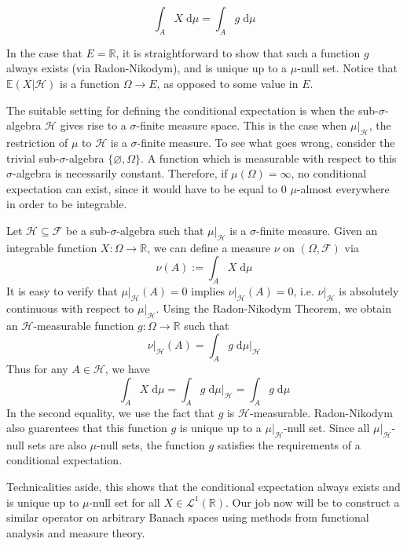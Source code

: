 \[
	\int_A X \; \textrm{d} \mu = \int_A g \; \textrm{d} \mu
\]

In the case that $E = \mathbb{R}$, it is straightforward to show that such a function $g$ always exists (via Radon-Nikodym), and is unique up to a $\mu$-null set. Notice that $\mathbb{E}(X \vert \mathcal{H})$ is a function $\Omega \rightarrow E$, as opposed to some value in $E$.

The suitable setting for defining the conditional expectation is when the sub-$\sigma$-algebra $\mathcal{H}$ gives rise to a $\sigma$-finite measure space. This is the case when $\mu\vert_\mathcal{H}$, the restriction of $\mu$ to $\mathcal{H}$ is a $\sigma$-finite measure. To see what goes wrong, consider the trivial sub-$\sigma$-algebra $\{\varnothing, \Omega\}$. A function which is measurable with respect to this $\sigma$-algebra is necessarily constant. Therefore, if $\mu(\Omega) = \infty$, no conditional expectation can exist, since it would have to be equal to $0$ $\mu$-almost everywhere in order to be integrable.

\vspace{0.3cm}
\begin{example}
Let $\mathcal{H} \subseteq \mathcal{F}$ be a sub-$\sigma$-algebra such that $\mu\vert_\mathcal{H}$ is a $\sigma$-finite measure. Given an integrable function $X : \Omega \rightarrow \mathbb{R}$, we can define a measure $\nu$ on $(\Omega, \mathcal{F})$ via
\[
	\nu(A) := \int_A X \; \textrm{d}\mu
\]
It is easy to verify that $\mu\vert_\mathcal{H}(A) = 0$ implies $\nu\vert_\mathcal{H}(A) = 0$, i.e. $\nu\vert_\mathcal{H}$ is absolutely continuous with respect to $\mu\vert_\mathcal{H}$. Using the Radon-Nikodym Theorem, we obtain an $\mathcal{H}$-measurable function $g : \Omega \rightarrow \mathbb{R}$ such that
\[
	\nu\vert_\mathcal{H}(A) = \int_A g \;\textrm{d}\mu\vert_\mathcal{H}
\]
Thus for any $A \in \mathcal{H}$, we have
\[
	\int_A X \; \textrm{d}\mu = \int_A g \;\textrm{d}\mu\vert_\mathcal{H} = \int_A g \;\textrm{d}\mu
\]
In the second equality, we use the fact that $g$ is $\mathcal{H}$-measurable. Radon-Nikodym also guarentees that this function $g$ is unique up to a $\mu\vert_\mathcal{H}$-null set. Since all $\mu\vert_\mathcal{H}$-null sets are also $\mu$-null sets, the function $g$ satisfies the requirements of a conditional expectation.
\end{example}
\vspace{0.3cm}

Technicalities aside, this shows that the conditional expectation always exists and is unique up to $\mu$-null set for all $X \in \mathcal{L}^1(\mathbb{R})$. Our job now will be to construct a similar operator on arbitrary Banach spaces using methods from functional analysis and measure theory.

